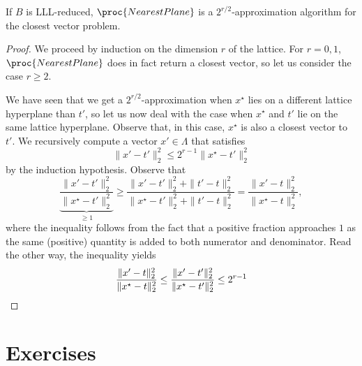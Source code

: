 \begin{theorem}
  If $B$ is LLL-reduced, $\proc{NearestPlane}$ is a $2^{r/2}$-approximation algorithm
  for the closest vector problem.
\end{theorem}
\begin{proof}
  We proceed by induction on the dimension $r$ of the lattice.
  For $r = 0,1$, $\proc{NearestPlane}$ does in fact return a closest vector,
  so let us consider the case $r \geq 2$.

  We have seen that we get a $2^{r/2}$-approximation when $x^\star$ lies on a different lattice hyperplane than $t'$,
  so let us now deal with the case when $x^\star$ and $t'$ lie on the same lattice hyperplane.
  Observe that, in this case, $x^\star$ is also a closest vector to $t'$.
  We recursively compute a vector $x' \in \Lambda$ that satisfies
  \[
    \| x' - t' \|_2^2 \leq 2^{r-1} \| x^\star - t' \|_2^2
  \]
  by the induction hypothesis.
  Observe that
  \[
    \underbrace{\frac{ \| x' - t' \|_2^2 }{ \| x^\star - t' \|_2^2 }}_{\geq 1}
    \geq \frac{ \| x' - t' \|_2^2 + \| t' - t \|_2^2 }{ \| x^\star - t' \|_2^2 + \| t' - t \|_2^2 }
    = \frac{ \| x' - t \|_2^2 }{ \| x^\star - t \|_2^2 },
  \]
  where the inequality follows from the fact that a positive fraction approaches $1$
  as the same (positive) quantity is added to both numerator and denominator.
  Read the other way, the inequality yields
  \[
    \frac{ \| x' - t \|_2^2 }{ \| x^\star - t \|_2^2 }
      \leq  \frac{ \| x' - t' \|_2^2 }{ \| x^\star - t' \|_2^2 }
      \leq 2^{r-1}
    \qedhere
  \]
\end{proof}







\section*{Exercises}

